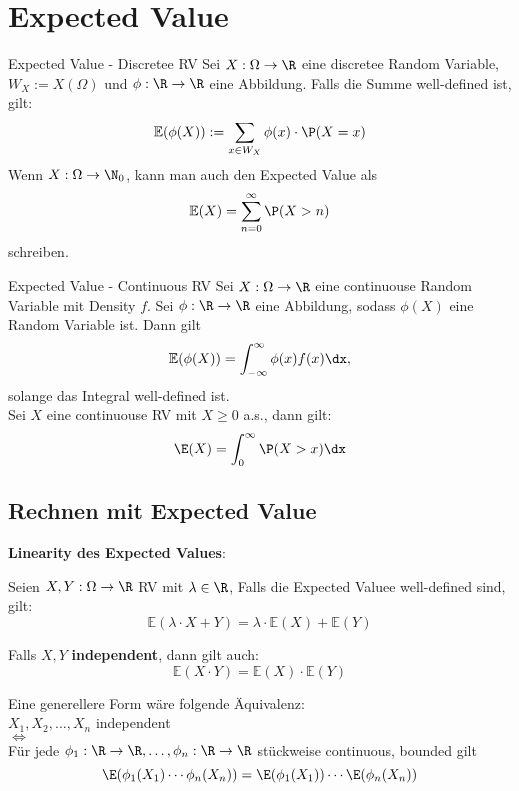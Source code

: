 \section{Expected Value}
\begin{mainbox}{Expected Value - Discretee RV}
    Sei $X: \Omega \to \R$ eine discretee Random Variable, $W_X := X(\Omega)$ und $\phi: \R \to \R$ eine Abbildung. Falls die Summe well-defined ist, gilt: 
    $$\mathbb{E}(\phi(X)) := \sum_{x \in W_X} \phi(x) \cdot \P(X = x)$$
    Wenn $X: \Omega \to \N_0$, kann man auch den Expected Value als
    $$\mathbb{E}(X) = \sum_{n = 0}^{\infty}\P(X > n)$$
    schreiben.
\end{mainbox}
\begin{mainbox}{Expected Value - Continuous RV}
    Sei $X: \Omega \to \R$ eine continuouse Random Variable mit Density $f$. Sei $\phi: \R \to \R$ eine Abbildung, sodass $\phi(X)$ eine Random Variable ist. Dann gilt
    $$\mathbb{E}(\phi(X))= \int_{-\infty}^\infty \phi(x)f(x)\dx,$$
    solange das Integral well-defined ist.
    \\Sei $X$ eine continuouse RV mit $X \geq 0$ a.s., dann gilt:
    $$\E(X)=\int_0^\infty \P(X > x)\dx$$ 
\end{mainbox}

\subsection{Rechnen mit Expected Value}
\textbf{Linearity des Expected Values}: 

Seien $X, Y: \Omega \to \R$ RV mit $\lambda \in \R$, Falls die Expected Valuee well-defined sind, gilt:
$$\mathbb{E}(\lambda \cdot X + Y) = \lambda \cdot \mathbb{E}(X) + \mathbb{E}(Y)$$

Falls $X, Y$ \textbf{independent}, dann gilt auch:
$$\mathbb{E}(X \cdot Y) = \mathbb{E}(X) \cdot \mathbb{E}(Y)$$

Eine generellere Form wäre folgende Äquivalenz:\\
$X_1, X_2, ...,X_n$ independent
\\$\iff$
\\Für jede $\phi_1: \R \to \R, \ldots, \phi_n: \R \to \R$ stückweise continuous, bounded gilt
$$\E(\phi_1(X_1)\cdots\phi_n(X_n))=\E(\phi_1(X_1))\cdots\E(\phi_n(X_n))$$ 

